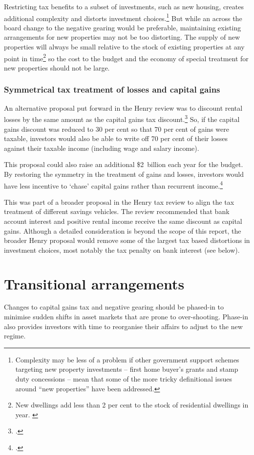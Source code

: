 \documentclass{grattan}\usepackage[]{graphicx}\usepackage[]{color}
\begin{document}
Restricting tax benefits to a subset of investments, such as new housing, creates additional complexity and distorts investment choices.\footnote{Complexity may be less of a problem if other government support schemes targeting new property investments -- first home buyer's grants and stamp duty concessions -- mean that some of the more tricky definitional issues around ``new properties'' have been addressed. }  But while an across the board change to the negative gearing would be preferable, maintaining existing arrangements for new properties may not be too distorting. The supply of new properties will always be small relative to the stock of existing properties at any point in time\footnote{New dwellings add less than 2 per cent to the stock of residential dwellings in year. \textcite[p.~47]{ACIL2015}}  so the cost to the budget and the economy of special treatment for new properties should not be large. 

\subsubsection{Symmetrical tax treatment of losses and capital gains}
An alternative proposal put forward in the Henry review was to discount rental losses by the same amount as the capital gains tax discount.\footcite[pp.~70,72]{Treasury2010}  So, if the capital gains discount was reduced to 30 per cent so that 70 per cent of gains were taxable, investors would also be able to write off 70 per cent of their losses against their taxable income (including wage and salary income). 

This proposal could also raise an additional \$2~billion each year for the budget. By restoring the symmetry in the treatment of gains and losses, investors would have less incentive to `chase' capital gains rather than recurrent income.\footcite[p.~418]{Treasury2010} 

This was part of a broader proposal in the Henry tax review to align the tax treatment of different savings vehicles. The review recommended that bank account interest and positive rental income receive the same discount as capital gains. Although a detailed consideration is beyond the scope of this report, the broader Henry proposal would remove some of the largest tax based distortions in investment choices, most notably the tax penalty on bank interest (see below). 


\section{Transitional arrangements}\label{sec:transitional_arrangements}
Changes to capital gains tax and negative gearing should be phased-in to minimise sudden shifts in asset markets that are prone to over-shooting. Phase-in also provides investors with time to reorganise their affairs to adjust to the new regime.
\end{document}
